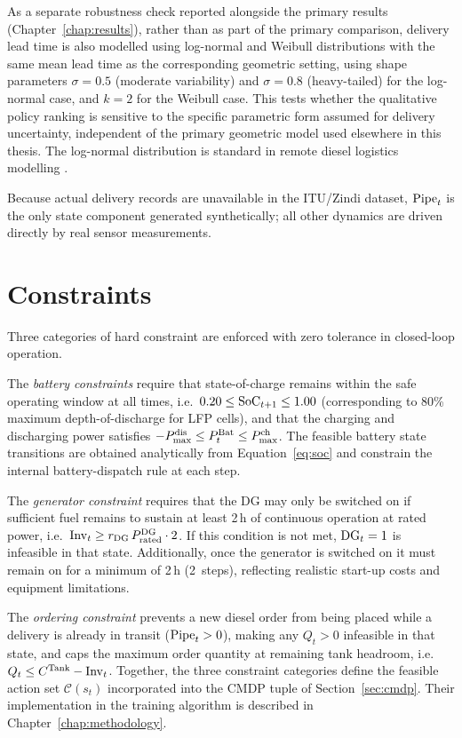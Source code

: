 As a separate robustness check reported alongside the primary results
(Chapter~\ref{chap:results}), rather than as part of the primary
comparison, delivery lead time is also modelled using log-normal and
Weibull distributions with the same mean lead time as the corresponding
geometric setting, using shape parameters $\sigma=0.5$ (moderate
variability) and $\sigma=0.8$ (heavy-tailed) for the log-normal case, and
$k=2$ for the Weibull case. This tests whether the qualitative policy
ranking is sensitive to the specific parametric form assumed for delivery
uncertainty, independent of the primary geometric model used elsewhere in
this thesis. The log-normal distribution is standard in remote diesel
logistics modelling \citep{srinivasan2013,shen2011}.

Because actual delivery records are unavailable in the ITU/Zindi dataset,
$\mathrm{Pipe}_t$ is the
only state component generated synthetically; all other dynamics are driven
directly by real sensor measurements.

\section{Constraints}
\label{sec:constraints}

Three categories of hard constraint are enforced with zero tolerance in
closed-loop operation.

The \emph{battery constraints} require that state-of-charge remains within
the safe operating window at all times, i.e.\ $0.20 \leq \mathrm{SoC}_{t+1} \leq 1.00$
(corresponding to 80\% maximum depth-of-discharge for LFP cells), and that
the charging and discharging power satisfies
$-P_{\max}^{\mathrm{dis}} \leq P_t^{\mathrm{Bat}} \leq P_{\max}^{\mathrm{ch}}$. The feasible battery
state transitions are obtained analytically from Equation~\eqref{eq:soc}
and constrain the internal battery-dispatch rule at each step.

The \emph{generator constraint} requires that the DG may only be switched on
if sufficient fuel remains to sustain at least 2\,h of continuous operation
at rated power, i.e.\ $\mathrm{Inv}_t \geq r_{\mathrm{DG}}\,P_{\mathrm{rated}}^{\mathrm{DG}}\cdot 2$.
If this condition is not met, $\mathrm{DG}_t = 1$ is infeasible in that state.
Additionally, once the generator is switched on it must remain on for a
minimum of 2\,h (2~steps), reflecting realistic start-up costs and equipment
limitations.

The \emph{ordering constraint} prevents a new diesel order from being placed
while a delivery is already in transit ($\mathrm{Pipe}_t > 0$), making any $Q_t > 0$
infeasible in that state, and caps the maximum order quantity at remaining
tank headroom, i.e.\ $Q_t \leq C^{\mathrm{Tank}} - \mathrm{Inv}_t$. Together, the three
constraint categories define the feasible action set $\mathcal{C}(s_t)$
incorporated into the CMDP tuple of Section~\ref{sec:cmdp}. Their
implementation in the training algorithm is described in
Chapter~\ref{chap:methodology}.

